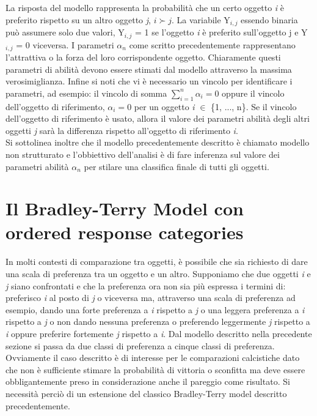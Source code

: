 La risposta del modello rappresenta la probabilità che un certo oggetto \textit{i} è preferito rispetto su un altro oggetto \textit{j}, $i \succ j$. La variabile Y$_{i,j}$ essendo binaria può assumere solo due valori, Y$_{i,j}$ = 1 se l'oggetto \textit{i} è preferito sull'oggetto j e Y$_{i,j}$ = 0 viceversa. I parametri $\alpha_{n}$ come scritto precedentemente rappresentano l'attrattiva o la forza del loro corrispondente oggetto. Chiaramente questi parametri di abilità devono essere stimati dal modello attraverso la massima verosimiglianza. Infine si noti che vi è necessario un vincolo per identificare i parametri, ad esempio: il vincolo di somma $ \sum_{i=1}^{n} \alpha_{i} = 0 $ oppure il vincolo dell'oggetto di riferimento, $\alpha_{i} = 0$ per un oggetto \textit{i} $\in$ \{1, ..., n\}. Se il vincolo dell'oggetto di riferimento è usato, allora il valore dei parametri abilità degli altri oggetti \textit{j} sarà la differenza rispetto all'oggetto di riferimento \textit{i}.
\\

Si sottolinea inoltre che il modello precedentemente descritto è chiamato modello non strutturato e l'obbiettivo dell'analisi è di fare inferenza sul valore dei parametri abilità $\alpha_{n}$ per stilare una classifica finale di tutti gli oggetti.


\section{Il Bradley-Terry Model con ordered response categories}	
In molti contesti di comparazione tra oggetti, è possibile che sia richiesto di dare una scala di preferenza tra un oggetto e un altro. Supponiamo che due oggetti \textit{i} e \textit{j} siano confrontati e che la preferenza ora non sia più espressa i termini di: preferisco \textit{i} al posto di \textit{j} o viceversa ma, attraverso una scala di preferenza ad esempio, dando una forte preferenza a \textit{i} rispetto a \textit{j} o una leggera preferenza a \textit{i} rispetto a \textit{j} o non dando nessuna preferenza o preferendo leggermente \textit{j} rispetto a \textit{i} oppure preferire fortemente \textit{j} rispetto a \textit{i}. Dal modello descritto nella precedente sezione si passa da due classi di preferenza a cinque classi di preferenza.\\
Ovviamente il caso descritto è di interesse per le comparazioni calcistiche dato che non è sufficiente stimare la probabilità di vittoria o sconfitta ma deve essere obbligantemente preso in considerazione anche il pareggio come risultato. Si necessità perciò di un estensione del classico Bradley-Terry model descritto precedentemente.\\

